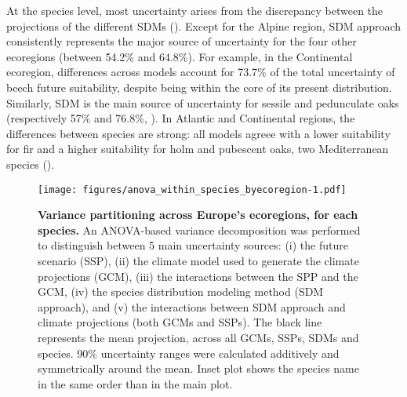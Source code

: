 \documentclass[letterpaper,8pt]{extarticle}  %
\begin{document}
\begin{doublespacing}
\begin{linenumbers}
At the species level, most uncertainty arises from the discrepancy between the projections of the different SDMs (). Except for the Alpine region, SDM approach consistently represents the major source of uncertainty for the four other ecoregions (between 54.2\% and 64.8\%). For example, in the Continental ecoregion, differences across models account for 73.7\% of the total uncertainty of beech future suitability, despite being within the core of its present distribution. Similarly, SDM is the main source of uncertainty for sessile and pedunculate oaks (respectively 57\% and 76.8\%, ). In Atlantic and Continental regions, the differences between species are strong: all models agreee with a lower suitability for fir and a higher suitability for holm and pubescent oaks, two Mediterranean species (). 

\begin{SCfigure}
\texttt{[image: figures/anova\_within\_species\_byecoregion-1.pdf]}
\caption{\textbf{Variance partitioning across Europe's ecoregions, for each species.} An ANOVA-based variance decomposition was performed to distinguish between 5 main uncertainty sources: (i) the future scenario (SSP), (ii) the climate model used to generate the climate projections (GCM), (iii) the interactions between the SPP and the GCM, (iv) the species distribution modeling method (SDM approach), and (v) the interactions between SDM approach and climate projections (both GCMs and SSPs). The black line represents the mean projection, across all GCMs, SSPs, SDMs and species. 90\% uncertainty ranges were calculated additively and symmetrically around the mean. Inset plot shows the species name in the same order than in the main plot.}
\label{fig:anovawithinspecies}
\end{SCfigure} 


\end{linenumbers}
\end{doublespacing}
\end{document}
